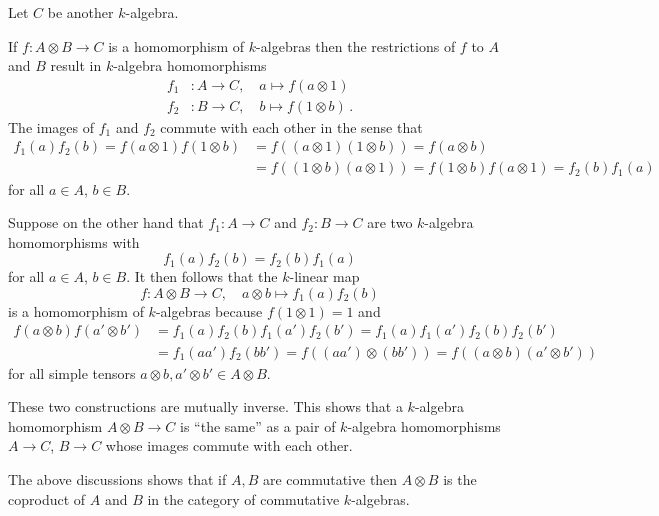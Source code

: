 \begin{fluff}
  \label{fluff: algebra homomorphisms out of tensor product}
  Let $C$ be another $k$-algebra.
  
  If $f \colon A \otimes B \to C$ is a homomorphism of $k$-algebras then the restrictions of $f$ to $A$ and $B$ result in $k$-algebra homomorphisms
  \begin{align*}
              f_1
    &\colon   A
     \to      C,
     \quad    a
     \mapsto  f(a \otimes 1)
  \\
              f_2
    &\colon   B
     \to      C,
     \quad    b
     \mapsto  f(1 \otimes b) \,.
  \end{align*}
  The images of $f_1$ and $f_2$ commute with each other in the sense that
  \begin{align*}
        f_1(a) f_2(b)
     =  f(a \otimes 1) f(1 \otimes b)
    &=  f((a \otimes 1)(1 \otimes b))
     =  f(a \otimes b)  \\
    &=  f((1 \otimes b)(a \otimes 1))
     =  f(1 \otimes b) f(a \otimes 1)
     =  f_2(b) f_1(a)
  \end{align*}
  for all $a \in A$, $b \in B$.
  
  Suppose on the other hand that $f_1 \colon A \to C$ and $f_2 \colon B \to C$ are two $k$-algebra homomorphisms with
  \[
      f_1(a) f_2(b)
    = f_2(b) f_1(a)
  \]
  for all $a \in A$, $b \in B$.
  It then follows that the $k$-linear map
  \[
            f
    \colon  A \otimes B
    \to     C,
    \quad   a \otimes b
    \mapsto f_1(a) f_2(b)
  \]
  is a homomorphism of $k$-algebras because $f(1 \otimes 1) = 1$ and
  \begin{align*}
        f(a \otimes b) f(a' \otimes b')
    &=  f_1(a) f_2(b) f_1(a') f_2(b')
     =  f_1(a) f_1(a') f_2(b) f_2(b') \\
    &=  f_1(a a') f_2(b b')
     =  f((a a') \otimes (b b'))
     =  f((a \otimes b) (a' \otimes b'))
  \end{align*}
  for all simple tensors $a \otimes b, a' \otimes b' \in A \otimes B$.
  
  These two constructions are mutually inverse.
  This shows that a $k$-algebra homomorphism $A \otimes B \to C$ is \enquote{the same} as a pair of $k$-algebra homomorphisms $A \to C$, $B \to C$ whose images commute with each other.
\end{fluff}


\begin{remark}
  The above discussions shows that if $A, B$ are commutative then $A \otimes B$ is the coproduct of $A$ and $B$ in the category of commutative $k$-algebras.
\end{remark}


